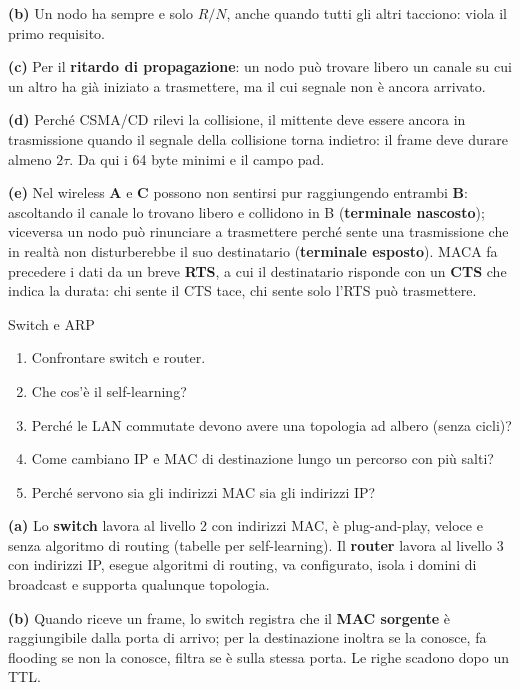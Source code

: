 \textbf{(b)} Un nodo ha sempre e solo $R/N$, anche quando tutti gli altri tacciono: viola il primo requisito.

\textbf{(c)} Per il \textbf{ritardo di propagazione}: un nodo può trovare libero un canale su cui un altro ha già iniziato a trasmettere, ma il
cui segnale non è ancora arrivato.

\textbf{(d)} Perché CSMA/CD rilevi la collisione, il mittente deve essere ancora in trasmissione quando il segnale della collisione torna
indietro: il frame deve durare almeno $2\tau$. Da qui i 64 byte minimi e il campo pad.

\textbf{(e)} Nel wireless \textbf{A} e \textbf{C} possono non sentirsi pur raggiungendo entrambi \textbf{B}: ascoltando il canale lo
trovano libero e collidono in B (\textbf{terminale nascosto}); viceversa un nodo può rinunciare a trasmettere perché sente una trasmissione
che in realtà non disturberebbe il suo destinatario (\textbf{terminale esposto}). MACA fa precedere i dati da un breve \textbf{RTS}, a cui il
destinatario risponde con un \textbf{CTS} che indica la durata: chi sente il CTS tace, chi sente solo l'RTS può trasmettere.

\begin{esercizio}{Switch e ARP}
\begin{enumerate}[label=(\alph*)]
    \item Confrontare switch e router.
    \item Che cos'è il self-learning?
    \item Perché le LAN commutate devono avere una topologia ad albero (senza cicli)?
    \item Come cambiano IP e MAC di destinazione lungo un percorso con più salti?
    \item Perché servono sia gli indirizzi MAC sia gli indirizzi IP?
\end{enumerate}
\end{esercizio}

\svolgimento
\textbf{(a)} Lo \textbf{switch} lavora al livello 2 con indirizzi MAC, è plug-and-play, veloce e senza algoritmo di routing (tabelle
per self-learning). Il \textbf{router} lavora al livello 3 con indirizzi IP, esegue algoritmi di routing, va configurato, isola i domini di
broadcast e supporta qualunque topologia.

\textbf{(b)} Quando riceve un frame, lo switch registra che il \textbf{MAC sorgente} è raggiungibile dalla porta di arrivo; per la
destinazione inoltra se la conosce, fa flooding se non la conosce, filtra se è sulla stessa porta. Le righe scadono dopo un TTL.

